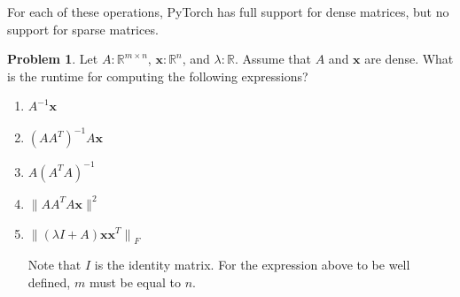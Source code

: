 \documentclass[10pt]{article}
\theoremstyle{definition}
\newtheorem{problem}{Problem}
\newcommand{\R}{\mathbb R}
\newcommand{\trans}[1]{{#1}^{T}}
\newcommand{\x}{\mathbf x}
\newcommand{\ltwo}[1]{{\lVert {#1} \rVert}_2}
\newcommand{\lp}[1]{{\lVert {#1} \rVert}_p}
\newcommand{\lF}[1]{{\lVert {#1} \rVert}_F}
\begin{document}
For each of these operations, PyTorch has full support for dense matrices,
but no support for sparse matrices.

%
%
\begin{problem}
    Let $A : \R^{m \times n}$, $\x : \R^n$, and $\lambda : \R$.
    Assume that $A$ and $\x$ are dense.
    What is the runtime for computing the following expressions?
    \begin{enumerate}
        \item $A^{-1}\x$
            \vspace{4in}
            \newpage
        \item $(A \trans A)^{-1} A \x$
            \vspace{4in}
            \newpage
        \item $A (\trans A A)^{-1}$
            \vspace{4in}
            \newpage
        \item $\|A \trans A A \x\|^2$ %
            \vspace{4in}
            \newpage
        \item $\lF{(\lambda I + A) \x \trans \x}$

            Note that $I$ is the identity matrix.
            For the expression above to be well defined, $m$ must be equal to $n$.
            \vspace{4in}
    \end{enumerate}
\end{problem}
\end{document}
